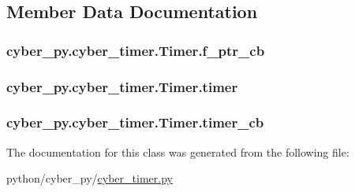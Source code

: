 \subsection{Member Data Documentation}
\hypertarget{classcyber__py_1_1cyber__timer_1_1Timer_a097dc3bac9a12163355d050d51dfb31b}{
\subsubsection[{f\-\_\-ptr\-\_\-cb}]{\setlength{\rightskip}{0pt plus 5cm}cyber\-\_\-py.\-cyber\-\_\-timer.\-Timer.\-f\-\_\-ptr\-\_\-cb}}\label{classcyber__py_1_1cyber__timer_1_1Timer_a097dc3bac9a12163355d050d51dfb31b}
\hypertarget{classcyber__py_1_1cyber__timer_1_1Timer_ab6eced17f6b54dbead937056a3e11def}{
\subsubsection[{timer}]{\setlength{\rightskip}{0pt plus 5cm}cyber\-\_\-py.\-cyber\-\_\-timer.\-Timer.\-timer}}\label{classcyber__py_1_1cyber__timer_1_1Timer_ab6eced17f6b54dbead937056a3e11def}
\hypertarget{classcyber__py_1_1cyber__timer_1_1Timer_a12707e11d95087467579b69228e0bfbe}{
\subsubsection[{timer\-\_\-cb}]{\setlength{\rightskip}{0pt plus 5cm}cyber\-\_\-py.\-cyber\-\_\-timer.\-Timer.\-timer\-\_\-cb}}\label{classcyber__py_1_1cyber__timer_1_1Timer_a12707e11d95087467579b69228e0bfbe}


The documentation for this class was generated from the following file\-:\begin{DoxyCompactItemize}
\item 
python/cyber\-\_\-py/\hyperlink{cyber__timer_8py}{cyber\-\_\-timer.\-py}\end{DoxyCompactItemize}
